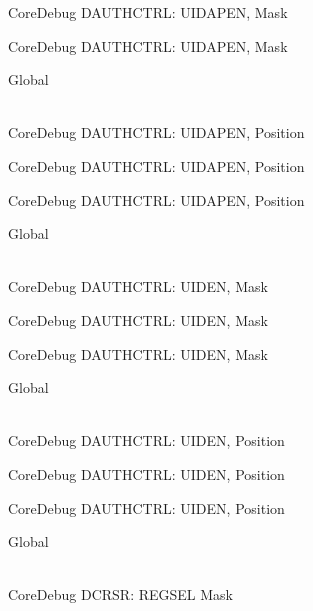 \begin{DoxyRefList}
\label{deprecated__deprecated000533}%
%
Core\+Debug DAUTHCTRL\+: UIDAPEN, Mask 

\label{deprecated__deprecated000635}%
%
Core\+Debug DAUTHCTRL\+: UIDAPEN, Mask  
\item[{\parbox[t]{\linewidth}{Global \doxylink{group___c_m_s_i_s___s_c_b_ga57a2ef70f6cc1e0903a8c3740512de46}{Core\+Debug\+\_\+\+DAUTHCTRL\+\_\+\+UIDAPEN\+\_\+\+Pos} }}]\hfill \\
\label{deprecated__deprecated000081}%
%
Core\+Debug DAUTHCTRL\+: UIDAPEN, Position 

\label{deprecated__deprecated000532}%
%
Core\+Debug DAUTHCTRL\+: UIDAPEN, Position 

\label{deprecated__deprecated000634}%
%
Core\+Debug DAUTHCTRL\+: UIDAPEN, Position  
\item[{\parbox[t]{\linewidth}{Global \doxylink{group___c_m_s_i_s___s_c_b_ga7d84e1642469f5c20b7ef7fa76a4fe95}{Core\+Debug\+\_\+\+DAUTHCTRL\+\_\+\+UIDEN\+\_\+\+Msk} }}]\hfill \\
\label{deprecated__deprecated000080}%
%
Core\+Debug DAUTHCTRL\+: UIDEN, Mask 

\label{deprecated__deprecated000531}%
%
Core\+Debug DAUTHCTRL\+: UIDEN, Mask 

\label{deprecated__deprecated000633}%
%
Core\+Debug DAUTHCTRL\+: UIDEN, Mask  
\item[{\parbox[t]{\linewidth}{Global \doxylink{group___c_m_s_i_s___s_c_b_gab9cb997565a842f5eb9365bd58d7cda2}{Core\+Debug\+\_\+\+DAUTHCTRL\+\_\+\+UIDEN\+\_\+\+Pos} }}]\hfill \\
\label{deprecated__deprecated000079}%
%
Core\+Debug DAUTHCTRL\+: UIDEN, Position 

\label{deprecated__deprecated000530}%
%
Core\+Debug DAUTHCTRL\+: UIDEN, Position 

\label{deprecated__deprecated000632}%
%
Core\+Debug DAUTHCTRL\+: UIDEN, Position  
\item[{\parbox[t]{\linewidth}{Global \doxylink{group___c_m_s_i_s___core_debug_ga17cafbd72b55030219ce5609baa7c01d}{Core\+Debug\+\_\+\+DCRSR\+\_\+\+REGSEL\+\_\+\+Msk} }}]\hfill \\
\label{deprecated__deprecated000044}%
%
Core\+Debug DCRSR\+: REGSEL Mask 


\end{DoxyRefList}
